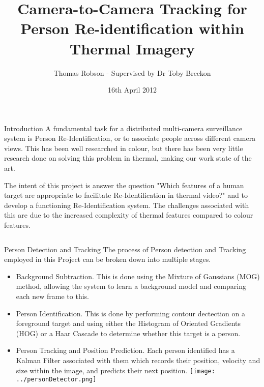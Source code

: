 \documentclass[final]{beamer}
\title[Thermal Re-ID]{Camera-to-Camera Tracking for Person Re-identification within Thermal Imagery}
\author[G Ingram]{Thomas Robson - Supervised by Dr Toby Breckon}
\institute[Durham]{School of Engineering and Computing Sciences, Durham University}
\date{16th April 2012}
\begin{document}
  \begin{frame}{} 

  \vfill
  \begin{block}{Introduction}
          A fundamental task for a distributed multi-camera surveillance system is Person Re-Identification, or to associate people across different camera views. This has been well researched in colour, but there has been very little research done on solving this problem in thermal, making our work state of the art. 

The intent of this project is answer the question "Which features of a human target are appropriate to facilitate Re-Identification in thermal video?" and to develop a functioning Re-Identification system. The challenges associated with this are due to the increased complexity of thermal features compared to colour features.
        \end{block}
        
    \begin{columns}[t]
      \begin{column}{.49\linewidth}
        
        \begin{block}{Person Detection and Tracking}
        	The process of Person detection and Tracking employed in this Project can be broken down into multiple stages. 
        	\begin{itemize}
        	\item Background Subtraction. This is done using the Mixture of Gaussians (MOG) method, allowing the system to learn a background model and comparing each new frame to this. 

        	\item Person Identification. This is done by performing contour dectection on a foreground target and using either the Histogram of Oriented Gradients (HOG) or a Haar Cascade to determine whether this target is a person.
        	
        	\item Person Tracking and Position Prediction. Each person identified has a Kalman Filter associated with them which records their position, velocity and size within the image, and predicts their next position. 
        \texttt{[image: ../personDetector.png]}  
          \end{itemize}
        \end{block}
        




\end{column}
\end{columns}
\end{frame}
\end{document}
